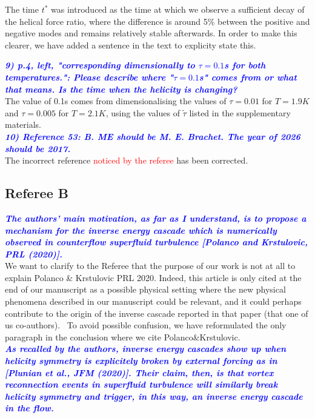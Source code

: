 \documentclass[a4paper,10pt]{article}
\def\red#1{\textcolor{red}{#1}}
\def\blue#1{\textcolor{blue}{#1}}
\def\refcomment#1{\textbf{\blue{\emph{#1}}}\\}
\begin{document}
    The time $t^*$ was introduced as the time at which we observe a sufficient decay of the helical force ratio, where the difference is around 5\% between the positive and negative modes and remains relatively stable afterwards. In order to make this clearer, we have added a sentence in the text to explicity state this.

    \refcomment{9) p.4, left, "corresponding dimensionally to $\tau = 0.1$s for both
    temperatures.": Please describe where "$\tau = 0.1$s" comes from or what
    that means. Is the time when the helicity is changing?}
    
    The value of 0.1s comes from dimensionalising the values of $\tau=0.01$ for $T=1.9K$ and $\tau=0.005$ for $T=2.1K$, using the values of $\tilde{\tau}$ listed in the supplementary materials. \\
    
    \refcomment{10) Reference 53: B. ME should be M. E. Brachet. The year of 2026
    should be 2017.}

    The incorrect reference \red{noticed by the referee} has been
    corrected.\\




\newpage
\subsection*{Referee B}

\refcomment{The authors’ main motivation, as far as I understand, is to propose a mechanism for the inverse energy cascade which is numerically observed in counterflow superfluid turbulence [Polanco and Krstulovic, PRL (2020)].}

We want to clarify to the Referee that the purpose of our work is not 
at all to explain Polanco \& Krstulovic PRL 2020. Indeed, this
 article is only cited at the end of our manuscript as a possible physical 
setting where the new physical phenomena described in our manuscript 
could be relevant, and it could perhaps contribute to the origin of 
the inverse cascade reported in that paper (that one of us co-authors).  
To avoid possible confusion, we have reformulated the only paragraph 
in the conclusion where we cite Polanco\&Krstulovic.\\

\refcomment{As recalled by the authors, inverse energy cascades show up when helicity symmetry is explicitely broken by external forcing as in [Plunian et al., JFM (2020)]. Their claim, then, is that vortex reconnection events in superfluid turbulence will similarly break helicity symmetry and trigger, in this way, an inverse energy cascade in the flow.}
\end{document}
